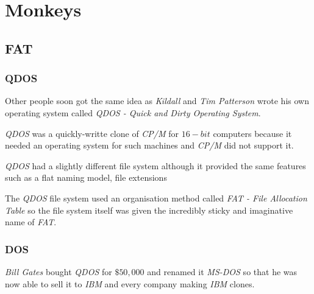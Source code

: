 %
%

\section{Monkeys}


\subsection{FAT}


\begin{frame}
  \frametitle{QDOS}

  Other people soon got the same idea as \textit{Kildall} and \textit{Tim
  Patterson} wrote his own operating system called \textit{QDOS - Quick
  and Dirty Operating System}.

  \-

  \textit{QDOS} was a quickly-writte clone of \textit{CP/M} for $16-bit$
  computers because it needed an operating system for such machines and
  \textit{CP/M} did not support it.

  \-

  \textit{QDOS} had a slightly different file system although it provided
  the same features such as a flat naming model, file extensions \etc{}

  \-

  The \textit{QDOS} file system used an organisation method called
  \textit{FAT - File Allocation Table} so the file system itself was given
  the incredibly sticky and imaginative name of \textit{FAT}.
\end{frame}


\begin{frame}
  \frametitle{DOS}

  \textit{Bill Gates} bought \textit{QDOS} for $\$50,000$ and renamed it
  \textit{MS-DOS} so that he was now able to sell it to \textit{IBM} and
  every company making \textit{IBM} clones.
\end{frame}


